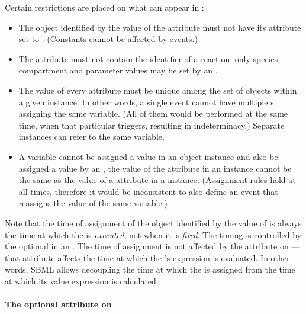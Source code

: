 Certain restrictions are placed on what can appear in
:
\begin{itemize}
  
\item The object identified by the value of the 
  attribute must not have its  attribute set 
  to .  (Constants cannot be affected by events.)
  
\item The  attribute must not contain the identifier
  of a reaction; only species, compartment and parameter values
  may be set by an \Event.
  
\item The value of every  attribute must be unique
  among the set of \EventAssignment objects within a given
  \Event instance.  In other words, a single event cannot have
  multiple \EventAssignment{}s assigning the same variable.  (All
  of them would be performed at the same time, when that
  particular \Event triggers, resulting in indeterminacy.)
  Separate \Event instances can refer to the same variable.
  
\item A variable cannot be assigned a value in an \EventAssignment
  object instance and also be assigned a value by an
  \AssignmentRule, \ie the value of the  attribute
  in an \EventAssignment instance cannot be the same as the value
  of a  attribute in a \AssignmentRule instance.
  (Assignment rules hold at all times, therefore it would be
  inconsistent to also define an event that reassigns the value of
  the same variable.)

\end{itemize}



Note that the time of assignment of the object identified by the
value of  is always the time at which the \Event
is \emph{executed}, not when it is \emph{fired}.  The timing is
controlled by the optional \Delay in an \Event.  The time of
assignment is not affected by the 
attribute on \Event---that attribute affects the time at which the
\EventAssignment's  expression is evaluated.  In other
words, SBML allows decoupling the time at which the
 is assigned from the time at which its value
expression is calculated.




\paragraph{The optional  attribute on }
\label{sec:eventassignment-sboterm}

